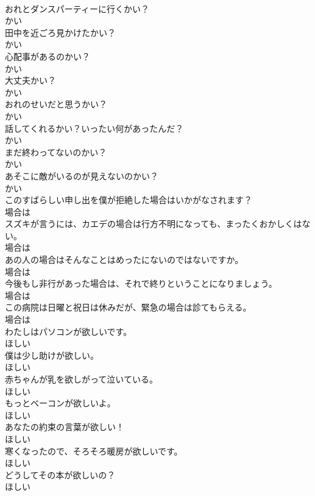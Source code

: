 \documentclass[8pt]{extreport}
\begin{document}
\begin{CJK}{UTF8}{min}
\\	おれとダンスパーティーに行くかい？	
\\	かい
\\	田中を近ごろ見かけたかい？	
\\	かい
\\	心配事があるのかい？	
\\	かい
\\	大丈夫かい？	
\\	かい
\\	おれのせいだと思うかい？	
\\	かい
\\	話してくれるかい？いったい何があったんだ？	
\\	かい
\\	まだ終わってないのかい？	
\\	かい
\\	あそこに敵がいるのが見えないのかい？	
\\	かい
\\	このすばらしい申し出を僕が拒絶した場合はいかがなされます？	
\\	場合は
\\	スズキが言うには、カエデの場合は行方不明になっても、まったくおかしくはない。	
\\	場合は
\\	あの人の場合はそんなことはめったにないのではないですか。	
\\	場合は
\\	今後もし非行があった場合は、それで終りということになりましょう。	
\\	場合は
\\	この病院は日曜と祝日は休みだが、緊急の場合は診てもらえる。	
\\	場合は
\\	わたしはパソコンが欲しいです。	
\\	ほしい
\\	僕は少し助けが欲しい。	
\\	ほしい
\\	赤ちゃんが乳を欲しがって泣いている。	
\\	ほしい
\\	もっとベーコンが欲しいよ。	
\\	ほしい
\\	あなたの約束の言葉が欲しい！	
\\	ほしい
\\	寒くなったので、そろそろ暖房が欲しいです。	
\\	ほしい
\\	どうしてその本が欲しいの？	
\\	ほしい

\end{CJK}
\end{document}
